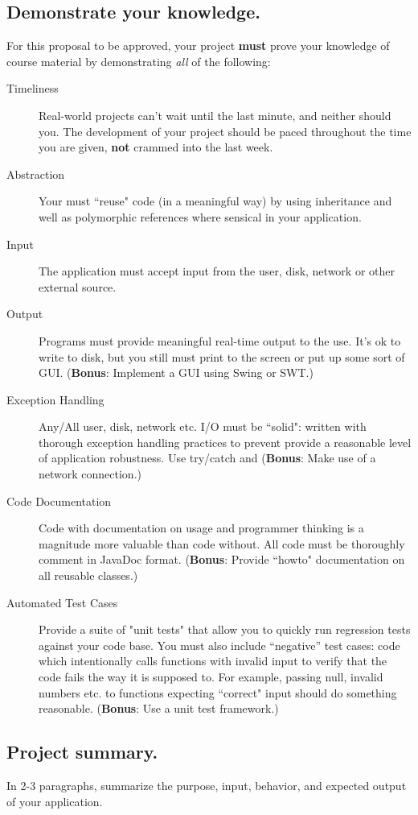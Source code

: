 \documentclass[11pt]{article}
\begin{document}
\subsection{Demonstrate your knowledge.}

For this proposal to be approved, your project {\bf must} prove your knowledge of course material by demonstrating {\it all} of the following:

\begin{description}
\item[Timeliness] Real-world projects can't wait until the last minute, and neither should you. The development of your project should be paced throughout the time you are given, {\bf not} crammed into the last week.
\item[Abstraction] Your must ``reuse" code (in a meaningful way) by using inheritance and well as polymorphic references where sensical in your application.
\item[Input] The application must accept input from the user, disk, network or other external source.
\item[Output] Programs must provide meaningful real-time output to the use. It's ok to write to disk, but you still must print to the screen or put up some sort of GUI. ({\bf Bonus}: Implement a GUI using Swing or SWT.)
\item[Exception Handling] Any/All user, disk, network etc. I/O must be ``solid": written with thorough exception handling practices to prevent provide a reasonable level of application robustness. Use try/catch and ({\bf Bonus}: Make use of a network connection.)
\item[Code Documentation] Code with documentation on usage and programmer thinking is a magnitude more valuable than code without. All code must be thoroughly comment in JavaDoc format. ({\bf Bonus}: Provide ``howto" documentation on all reusable classes.)
\item[Automated Test Cases] Provide a suite of "unit tests" that allow you to quickly run regression tests against your code base. You must also include ``negative'' test cases: code which intentionally calls functions with invalid input to verify that the code fails the way it is supposed to. For example, passing null, invalid numbers etc. to functions expecting ``correct" input should do something reasonable. ({\bf Bonus}: Use a unit test framework.) 
\end{description}

\subsection{Project summary.}
In 2-3 paragraphs, summarize the purpose, input, behavior, and expected output of your application.
\end{document}
